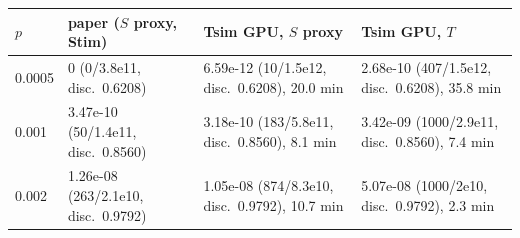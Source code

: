 \begin{tabular}{l l l l}
\toprule
$p$ & paper ($S$ proxy, Stim) & Tsim GPU, $S$ proxy & Tsim GPU, $T$ \\
\midrule
0.0005 & 0 (0/3.8e11, disc.\ 0.6208) & 6.59e-12 (10/1.5e12, disc.\ 0.6208), 20.0 min & 2.68e-10 (407/1.5e12, disc.\ 0.6208), 35.8 min \\
0.001 & 3.47e-10 (50/1.4e11, disc.\ 0.8560) & 3.18e-10 (183/5.8e11, disc.\ 0.8560), 8.1 min & 3.42e-09 (1000/2.9e11, disc.\ 0.8560), 7.4 min \\
0.002 & 1.26e-08 (263/2.1e10, disc.\ 0.9792) & 1.05e-08 (874/8.3e10, disc.\ 0.9792), 10.7 min & 5.07e-08 (1000/2e10, disc.\ 0.9792), 2.3 min \\
\bottomrule
\end{tabular}
